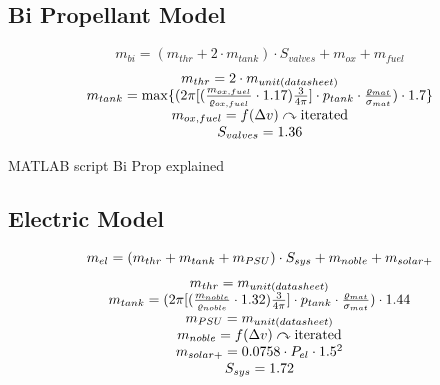 \subsection{Bi Propellant Model}

\begin{equation}
    m_{bi} = ( m_{thr} + 2 \cdot m_{tank}) \cdot S_{valves} + m_{ox} + m_{fuel}
    \label{eq:mass-bi}
\end{equation}
\begin{equation*}
    \begin{array}{c}
    m_{thr} =  2 \cdot m_{unit(datasheet)} \\
    m_{tank} =  \max \lbrace ( 2 \pi [ ( \frac{m_{ox,fuel}}{\varrho_{ox,fuel}} \cdot 1.17 ) \frac{3}{4 \pi}] \cdot p_{tank} \cdot \frac{\varrho_{mat}}{\sigma_{mat}} ) \cdot 1.7 \rbrace\\
    m_{ox,fuel} = f(\Delta v) \curvearrowright \textnormal{iterated} \\
    S_{valves} = 1.36
    \end{array}
    \label{eq:mass-bi-items}
\end{equation*}

MATLAB script Bi Prop explained

\subsection{Electric Model}

\begin{equation}
    m_{el} = ( m_{thr} +  m_{tank} + m_{PSU} ) \cdot S_{sys}  + m_{noble} + m_{solar\textnormal{+}}
    \label{eq:mass-elec}
\end{equation}
\begin{equation*}
    \begin{array}{c}
    m_{thr} = m_{unit(datasheet)}  \\
    m_{tank} =  ( 2 \pi [ ( \frac{m_{noble}}{\varrho_{noble}} \cdot 1.32 ) \frac{3}{4 \pi}] \cdot p_{tank} \cdot \frac{\varrho_{mat}}{\sigma_{mat}} ) \cdot 1.44 \\
    m_{PSU} = m_{unit(datasheet)} \\
    m_{noble} = f(\Delta v) \curvearrowright \textnormal{iterated} \\
    m_{solar\textnormal{+}} = 0.0758 \cdot P_{el} \cdot 1.5^2 \\
    S_{sys} = 1.72 
    \end{array}
    \label{eq:mass-elec-items}
\end{equation*}

